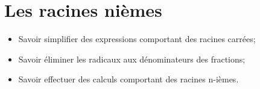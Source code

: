 \chapter{Les racines nièmes}\label{ChLesRacines}

\begin{acquis}
\begin{itemize}
\item Savoir simplifier des expressions comportant des racines carrées;
\item Savoir éliminer les radicaux aux dénominateurs des fractions;
\item Savoir effectuer des calculs comportant des racines n-ièmes.
\end{itemize}
\end{acquis}



\exercicesbase
\begin{colonne*exercice}

\end{colonne*exercice}

\connaissances
%

\pagebreak



